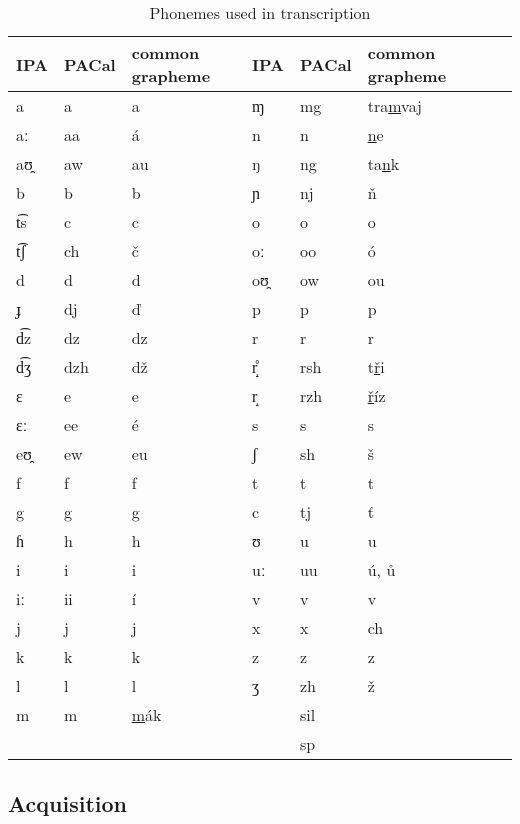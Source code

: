 \documentclass{itatnew}
\begin{document}
\begin{table*}[htpb]
\begin{center}
\begin{tabular}{|l|l|l|l||l|l|l|l|}
\hline
IPA & PACal & common grapheme & IPA & PACal &  common grapheme \\
\hline
a  & a   & a      &     ɱ  & mg  & tra\underline{m}vaj \\
aː & aa  & á      &     n  & n   & \underline{n}e \\
aʊ̯ & aw  & au     &     ŋ  & ng  & ta\underline{n}k \\
b  & b   & b      &     ɲ  & nj  & \v{n} \\
t͡s & c   & c      &     o  & o   & o \\
t͡ʃ & ch  & č      &     oː & oo  & ó \\
d  & d   & d      &     oʊ̯ & ow  & ou \\
ɟ  & dj  & \v{d}  &     p  & p   & p \\
d͡z & dz  & dz     &     r  & r   & r \\
d͡ʒ & dzh & dž     &     r̝̊  & rsh & t\underline{\v{r}}i \\
ɛ  & e   & e      &     r̝  & rzh & \underline{\v{r}}íz \\
ɛː & ee  & é      &     s  & s   & s \\
eʊ̯ & ew  & eu     &     ʃ  & sh  & š \\
f  & f   & f      &     t  & t   & t \\
g  & g   & g      &     c  & tj  & \v{t} \\
ɦ  & h   & h      &     ʊ  & u   & u \\
i  & i   & i      &     uː & uu  & ú, \r{u} \\
iː & ii  & í      &     v  & v   & v \\
j  & j   & j      &     x  & x   & ch \\
k  & k   & k      &     z  & z   & z \\
l  & l   & l      &     ʒ  & zh  & ž \\
m  & m   & \underline{m}ák
                  &        & sil & \\
   &     &        &        & sp  & \\
\hline
\end{tabular}
\caption{Phonemes used in transcription}\label{tab:phones}
\end{center}
\end{table*}
\normalfont

\subsection{Acquisition}
\end{document}
